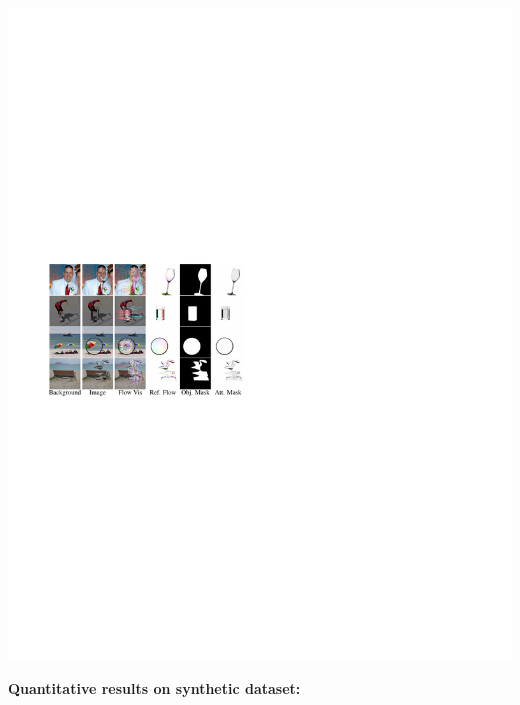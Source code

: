 \documentclass[landscape,a0paper,fontscale=0.292]{baposter}
\begin{document}
\begin{poster}
{\begin{minipage}{0.5\linewidth}
\begin{center}
            \includegraphics[width=\linewidth]{images/syn_data_sample}
        \end{center}
    \end{minipage}

    \textbf{\color{blue}Quantitative results on synthetic dataset:}

    

}
\end{poster}
\end{document}
